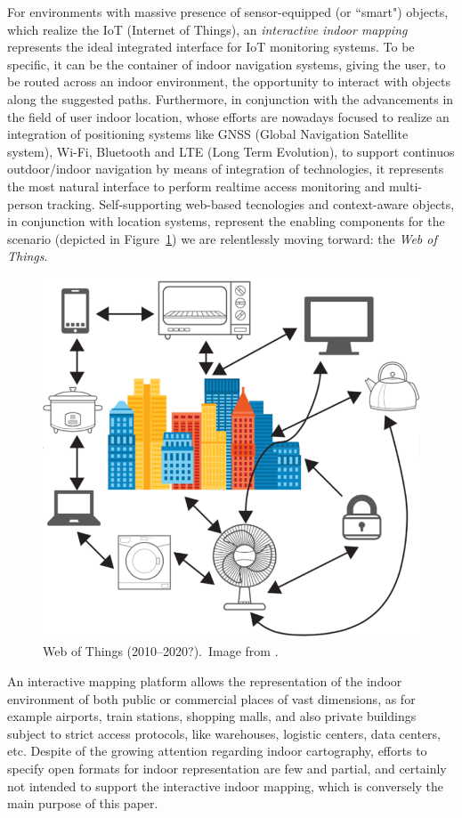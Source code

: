\documentclass[]{egpubl}
\begin{document}
For environments with massive presence of sensor-equipped (or ``smart")
objects, which realize the IoT (Internet of Things), an \emph{interactive indoor
mapping} represents the ideal integrated interface for IoT monitoring systems.
To be specific, it can be the container of indoor navigation systems, giving
the user, to be routed across an indoor environment, the opportunity to
interact with objects along the suggested paths. Furthermore, in conjunction
with the advancements in the field of user indoor location, whose efforts are
nowadays focused to realize an integration of positioning systems like GNSS
(Global Navigation Satellite system), Wi-Fi, Bluetooth and LTE (Long Term
Evolution), to support continuos outdoor/indoor navigation by means of
integration of technologies, it represents the most natural interface to
perform realtime access monitoring and multi-person tracking. Self-supporting web-based
tecnologies and context-aware objects, in conjunction  with
location systems, represent the enabling components for the scenario (depicted in
Figure~\ref{fig:web-of-thing}) we are relentlessly moving torward: the \emph{Web of
Things}.

\begin{figure}[htbp]
\centering
\includegraphics[width=.5\linewidth]{images/webOfThings.pdf}
\caption{Web of Things (2010--2020?).~Image from \cite{webOfThings:2015}.}
\label{fig:web-of-thing}
\end{figure}


An interactive mapping platform allows the representation of the indoor
environment of  both public or commercial places of vast dimensions, as for
example airports, train stations, shopping malls, and also private buildings
subject to strict access protocols, like warehouses, logistic centers, data
centers, etc. Despite of the growing attention regarding indoor cartography,
efforts to specify open formats for indoor representation are few and partial,
and certainly not intended to support the interactive indoor mapping, which is
conversely the main purpose of this paper.
\end{document}
